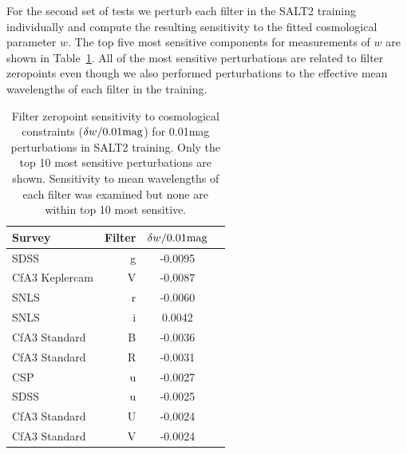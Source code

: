\documentclass[twocolumn]{aastex63}
\newcommand{\blue}{\color{black}}
\begin{document}
For the second set of tests we perturb each filter in the SALT2 training individually and compute the resulting sensitivity to the fitted cosmological parameter $w$. The top five most sensitive components for measurements of $w$ are shown in Table~\ref{tab:sensitivity}. All of the most sensitive perturbations are related to filter zeropoints even though we also performed perturbations to the effective mean wavelengths of each filter in the training.


\begin{table}
\centering
\begin{tabular}{lrcr}
\toprule
 Survey & Filter & $\delta w/ 0.01 {\rm mag}$ \\
\hline
            SDSS &  g  &  -0.0095\\
 CfA3 Keplercam  &  V  &  -0.0087\\
         SNLS    &  r  &  -0.0060\\
         SNLS    &  i  &   0.0042\\
   CfA3 Standard &  B  &  -0.0036\\
    CfA3 Standard&  R  &  -0.0031\\
        CSP      &  u  &  -0.0027\\
         SDSS    &  u  &  -0.0025\\
   CfA3 Standard &  U  &  -0.0024\\
  CfA3 Standard  &  V  &  -0.0024\\
\hline

\end{tabular}
\caption{{\blue Filter zeropoint sensitivity to cosmological constraints ($\delta w/0.01 {\rm mag}$) for 0.01mag perturbations in SALT2 training. Only the top 10 most sensitive perturbations are shown. Sensitivity to mean wavelengths of each filter was examined but none are within top 10 most sensitive.}
}
\label{tab:sensitivity}
\end{table}
\end{document}
